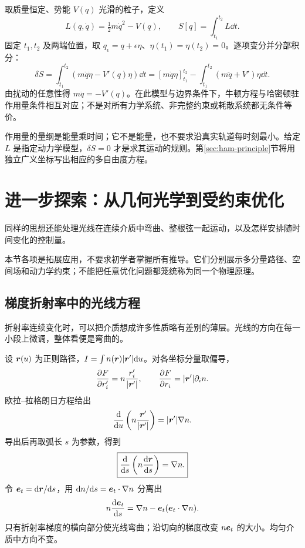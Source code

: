 \begin{example}[固定时间端点的一维保守粒子]
取质量恒定、势能 $V(q)$ 光滑的粒子，定义
\[
L(q,\dot q)=\tfrac12m\dot q^2-V(q),\qquad
S[q]=\int_{t_1}^{t_2}L\dd t.
\]
固定 $t_1,t_2$ 及两端位置，取 $q_\epsilon=q+\epsilon\eta$、$\eta(t_1)=\eta(t_2)=0$。逐项变分并分部积分：
\[
\delta S=\int_{t_1}^{t_2}(m\dot q\dot\eta-V'(q)\eta)\dd t
=[m\dot q\eta]_{t_1}^{t_2}-\int_{t_1}^{t_2}(m\ddot q+V')\eta\dd t.
\]
由扰动的任意性得 $m\ddot q=-V'(q)$。在此模型与边界条件下，牛顿方程与哈密顿驻作用量条件相互对应；不是对所有力学系统、非完整约束或耗散系统都无条件等价。
\end{example}
作用量的量纲是能量乘时间；它不是能量，也不要求沿真实轨道每时刻最小。给定 $L$ 是指定动力学模型，$\delta S=0$ 才是求其运动的规则。第\ref{sec:ham-principle}节将用独立广义坐标写出相应的多自由度方程。

\section{进一步探索：从几何光学到受约束优化}
同样的思想还能处理光线在连续介质中弯曲、整根弦一起运动，以及怎样安排随时间变化的控制量。

本节各项是拓展应用，不要求初学者掌握所有推导。它们分别展示多分量路径、空间场和动力学约束；不能把任意优化问题都笼统称为同一个物理原理。
\subsection{梯度折射率中的光线方程}
折射率连续变化时，可以把介质想成许多性质略有差别的薄层。光线的方向在每一小段上微调，整体看便是弯曲的。

设 $\boldsymbol{r}(u)$ 为正则路径，$I=\int n(\boldsymbol{r})|\boldsymbol{r}'|\mathrm{d} u$。对各坐标分量取偏导，
\[
\frac{\partial F}{\partial r_i'}=n\frac{r_i'}{|\boldsymbol{r}'|},\qquad
\frac{\partial F}{\partial r_i}=|\boldsymbol{r}'|\partial_i n.
\]
欧拉--拉格朗日方程给出
\[
\frac{\mathrm{d}}{\mathrm{d} u}\left(n\frac{\boldsymbol{r}'}{|\boldsymbol{r}'|}\right)=|\boldsymbol{r}'|\nabla n.
\]
导出后再取弧长 $s$ 为参数，得到
\begin{equation}\label{eq:ray-equation}
\boxed{\frac{\mathrm{d}}{\mathrm{d} s}\left(n\frac{\mathrm{d}\boldsymbol{r}}{\mathrm{d} s}\right)=\nabla n.}
\end{equation}
令 $\boldsymbol{e}_t=\mathrm{d}\boldsymbol{r}/\mathrm{d} s$，用 $\mathrm{d} n/\mathrm{d} s=\boldsymbol{e}_t\cdot\nabla n$ 分离出
\[
n\frac{\mathrm{d}\boldsymbol{e}_t}{\mathrm{d} s}=\nabla n-\boldsymbol{e}_t(\boldsymbol{e}_t\cdot\nabla n).
\]
只有折射率梯度的横向部分使光线弯曲；沿切向的梯度改变 $n\boldsymbol{e}_t$ 的大小。均匀介质中方向不变。

